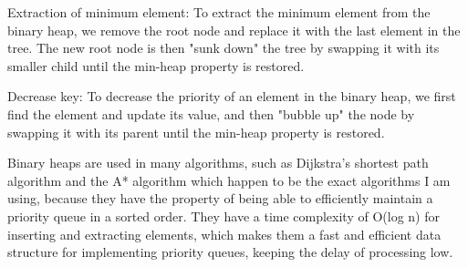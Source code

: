 \begin{FlushLeft}
    Extraction of minimum element: To extract the minimum element from the binary heap, we remove the root node and replace it with the last element in the tree. The new root node is then "sunk down" the tree by swapping it with its smaller child until the min-heap property is restored.\\ \bk
    
    Decrease key: To decrease the priority of an element in the binary heap, we first find the element and update its value, and then "bubble up" the node by swapping it with its parent until the min-heap property is restored.\\ \bk
    
    Binary heaps are used in many algorithms, such as Dijkstra's shortest path algorithm and the A* algorithm which happen to be the exact algorithms I am using, because they have the property of being able to efficiently maintain a priority queue in a sorted order. They have a time complexity of O(log n) for inserting and extracting elements, which makes them a fast and efficient data structure for implementing priority queues, keeping the delay of processing low.\\ \bk

    \bk








\end{FlushLeft}